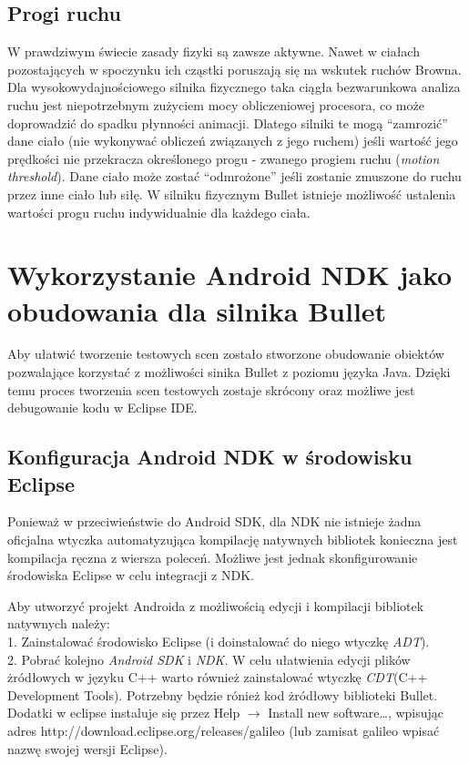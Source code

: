 \subsection{Progi ruchu}
W prawdziwym świecie zasady fizyki są zawsze aktywne. Nawet w ciałach
pozostających w spoczynku ich cząstki poruszają się na wskutek ruchów Browna.
Dla wysokowydajnościowego silnika fizycznego taka ciągła bezwarunkowa analiza
ruchu jest niepotrzebnym zużyciem mocy obliczeniowej procesora, co może
doprowadzić do spadku płynności animacji. Dlatego silniki te mogą ``zamrozić''
dane ciało (nie wykonywać obliczeń związanych z jego ruchem) jeśli wartość jego
prędkości nie przekracza określonego progu - zwanego progiem
ruchu (\emph{motion threshold}). Dane ciało może zostać ``odmrożone'' jeśli
zostanie zmuszone do ruchu przez inne ciało lub siłę. W silniku fizycznym Bullet
istnieje możliwość ustalenia wartości progu ruchu indywidualnie dla każdego
ciała.


\newpage
\section{Wykorzystanie Android NDK jako obudowania dla silnika Bullet}
Aby ułatwić tworzenie testowych scen zostało stworzone obudowanie obiektów
pozwalające korzystać z możliwości sinika Bullet z poziomu języka Java. Dzięki
temu proces tworzenia scen testowych zostaje skrócony oraz możliwe jest
debugowanie kodu w Eclipse IDE.

\subsection{Konfiguracja Android NDK w środowisku Eclipse}\label{sec:autoNDK}
Ponieważ w przeciwieństwie do Android SDK, dla NDK nie istnieje żadna
oficjalna wtyczka automatyzująca kompilację natywnych bibliotek konieczna jest
kompilacja ręczna z wiersza poleceń. Możliwe jest jednak skonfigurowanie
środowiska Eclipse w celu integracji z NDK.
  
Aby utworzyć projekt Androida z
możliwością edycji i kompilacji bibliotek natywnych należy: \\
1. Zainstalować środowisko Eclipse (i doinstalować do niego wtyczkę
\emph{ADT}).\\
2. Pobrać kolejno \emph{Android SDK} i \emph{NDK}. W celu ułatwienia edycji
plików żródłowych w języku C++ warto również zainstalować wtyczkę 
\emph{CDT}(C++ Development Tools). Potrzebny będzie rónież kod żródłowy
biblioteki Bullet. Dodatki w eclipse instaluje się przez Help $ \rightarrow $
Install  new software\ldots , wpisując adres
http://download.eclipse.org/releases/galileo (lub zamisat galileo wpisać nazwę
swojej wersji Eclipse).
  
